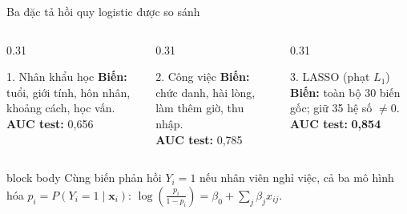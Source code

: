 \documentclass[10pt,aspectratio=169]{beamer}
\begin{document}
\begin{frame}{Ba đặc tả hồi quy logistic được so sánh}
  \begin{columns}[T,onlytextwidth]
    \begin{column}{0.31\textwidth}
      \begin{block}{1. Nhân khẩu học}
        \small
        \textbf{Biến:} tuổi, giới tính, hôn nhân, khoảng cách, học vấn.\\[0.14cm]
        \textbf{AUC test:} 0,656
      \end{block}
    \end{column}
    \begin{column}{0.31\textwidth}
      \begin{block}{2. Công việc}
        \small
        \textbf{Biến:} chức danh, hài lòng, làm thêm giờ, thu nhập.\\[0.14cm]
        \textbf{AUC test:} 0,785
      \end{block}
    \end{column}
    \begin{column}{0.31\textwidth}
      \begin{block}{3. LASSO (phạt $L_1$)}
        \small
        \textbf{Biến:} toàn bộ 30 biến gốc; giữ 35 hệ số $\neq 0$.\\[0.14cm]
        \textbf{AUC test:} \textbf{0,854}
      \end{block}
    \end{column}
  \end{columns}
  \vspace{0.22cm}
  \begin{beamercolorbox}[sep=0.14cm,rounded=true]{block body}
    \centering\small
    Cùng biến phản hồi $Y_i=1$ nếu nhân viên nghỉ việc, cả ba mô hình hóa
    $p_i=P(Y_i=1\mid\mathbf{x}_i)$:
    $\displaystyle \log\!\left(\frac{p_i}{1-p_i}\right)
      =\beta_0+\sum_j\beta_jx_{ij}$.
  \end{beamercolorbox}
\end{frame}
\end{document}
